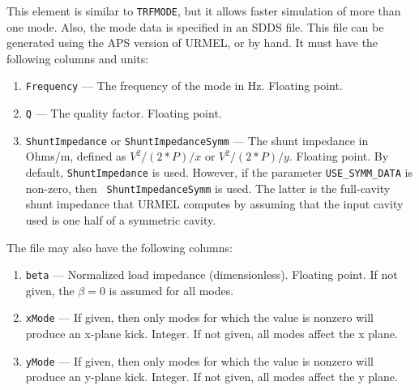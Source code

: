 This element is similar to {\tt TRFMODE}, but it allows faster simulation of more than
one mode.  Also, the mode data is specified in an SDDS file.  This file can be
generated using the APS version of URMEL, or by hand. It must have the following
columns and units:
\begin{enumerate}
\item {\tt Frequency} --- The frequency of the mode in Hz.  Floating point.
\item {\tt Q} --- The quality factor.  Floating point.
\item {\tt ShuntImpedance} or {\tt ShuntImpedanceSymm} --- The shunt
  impedance in Ohms/m, defined as $V^2/(2*P)/x$ or $V^2/(2*P)/y$.
  Floating point. By default, {\tt ShuntImpedance} is used.  However,
  if the parameter \verb|USE_SYMM_DATA| is non-zero, then {\tt
  ShuntImpedanceSymm} is used.  The latter is the full-cavity shunt
  impedance that URMEL computes by assuming that the input cavity used
  is one half of a symmetric cavity.
\end{enumerate}

The file may also have the following columns:
\begin{enumerate}
\item {\tt beta} --- Normalized load impedance (dimensionless).  Floating point. If not given, the
 $\beta=0$ is assumed for all modes. 
\item {\tt xMode} --- If given, then only modes for which the value is nonzero will produce an
 x-plane kick.  Integer.  If not given, all modes affect the x plane.
\item {\tt yMode} --- If given, then only modes for which the value is nonzero will produce an
 y-plane kick.  Integer.  If not given, all modes affect the y plane.
\end{enumerate}
    

